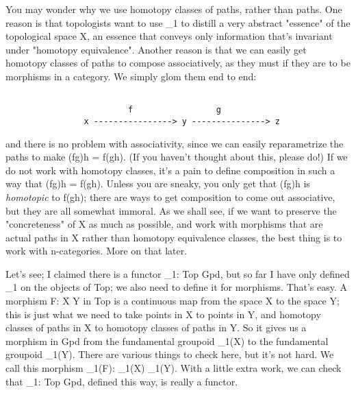 You may wonder why we use homotopy classes of paths, rather than paths.
One reason is that topologists want to use \Pi _{1} to distill a
very abstract "essence" of the topological space X, an essence
that conveys only information that's invariant under "homotopy
equivalence".  Another reason is that we can easily get homotopy
classes of paths to compose associatively, as they must if they are to
be morphisms in a category.  We simply glom them end to end:


\begin{verbatim}

                         f                 g
                x ----------------> y ---------------> z

\end{verbatim}
    
and there is no problem with associativity, since we can easily
reparametrize the paths to make (fg)h = f(gh).  (If you haven't thought
about this, please do!)  If we do not work with homotopy classes, it's a
pain to define composition in such a way that (fg)h = f(gh).  Unless you
are sneaky, you only get that (fg)h is \emph{homotopic} to f(gh); there are
ways to get composition to come out associative, but they are all somewhat
immoral.  As we shall see, if we want to preserve the "concreteness" 
of X as much as possible, and work with morphisms that are actual paths
in X rather than homotopy equivalence classes, the best thing is to work
with n-categories.  More on that later.

Let's see; I claimed there is a functor \Pi _{1}: Top \to  Gpd,
but so far I have only defined \Pi _{1} on the objects of Top; we
also need to define it for morphisms.  That's easy.  A morphism F: X
\to  Y in Top is a continuous map from the space X to the space Y; this
is just what we need to take points in X to points in Y, and homotopy
classes of paths in X to homotopy classes of paths in Y.  So it gives us
a morphism in Gpd from the fundamental groupoid \Pi _{1}(X) to the
fundamental groupoid \Pi _{1}(Y).  There are various things to
check here, but it's not hard.  We call this morphism \Pi _{1}(F):
\Pi _{1}(X) \to  \Pi _{1}(Y).  With a little extra work, we
can check that \Pi _{1}: Top \to  Gpd, defined this way, is
really a functor.

